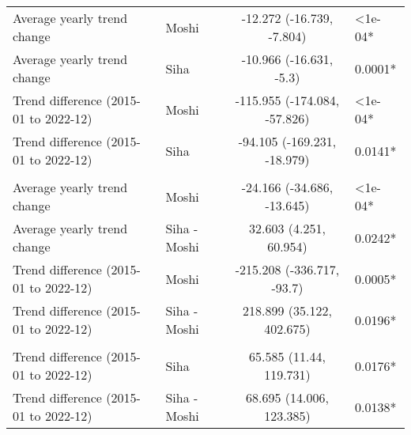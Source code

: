 \begin{longtable}{l|lcl}
Average yearly trend change & Moshi & -12.272 (-16.739, -7.804) & <1e-04* \\ 
Average yearly trend change & Siha & -10.966 (-16.631, -5.3) & 0.0001* \\ 
Trend difference (2015-01 to 2022-12) & Moshi & -115.955 (-174.084, -57.826) & <1e-04* \\ 
Trend difference (2015-01 to 2022-12) & Siha & -94.105 (-169.231, -18.979) & 0.0141* \\ 
\midrule\addlinespace[2.5pt]
\multicolumn{4}{l}{Diarrhea} \\[2.5pt] 
\midrule\addlinespace[2.5pt]
Average yearly trend change & Moshi & -24.166 (-34.686, -13.645) & <1e-04* \\ 
Average yearly trend change & Siha - Moshi & 32.603 (4.251, 60.954) & 0.0242* \\ 
Trend difference (2015-01 to 2022-12) & Moshi & -215.208 (-336.717, -93.7) & 0.0005* \\ 
Trend difference (2015-01 to 2022-12) & Siha - Moshi & 218.899 (35.122, 402.675) & 0.0196* \\ 
\midrule\addlinespace[2.5pt]
\multicolumn{4}{l}{Neoplasms/Cancer} \\[2.5pt] 
\midrule\addlinespace[2.5pt]
Trend difference (2015-01 to 2022-12) & Siha & 65.585 (11.44, 119.731) & 0.0176* \\ 
Trend difference (2015-01 to 2022-12) & Siha - Moshi & 68.695 (14.006, 123.385) & 0.0138* \\ 
\bottomrule
\end{longtable}
\endgroup

